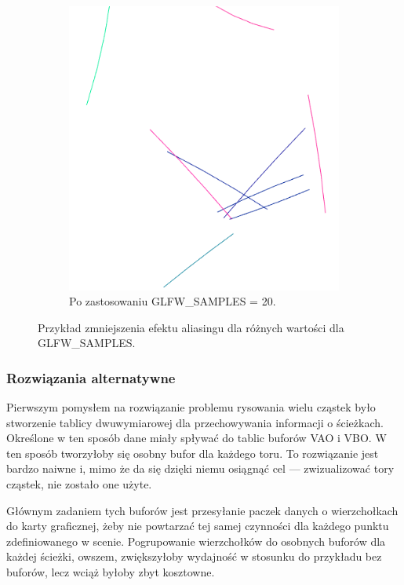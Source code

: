 \begin{figure}[H]
\begin{subfigure}{0.5\textwidth}
		\includegraphics[width=\textwidth]{Wart20.png}
    	\caption{Po zastosowaniu GLFW\_SAMPLES = 20.}
		\label{rys16}
	\end{subfigure}
    \caption{Przykład zmniejszenia efektu aliasingu dla różnych wartości dla GLFW\_SAMPLES.}
    \label{rys17}
\end{figure}

\subsubsection{Rozwiązania alternatywne}

Pierwszym pomysłem na rozwiązanie problemu rysowania wielu cząstek było stworzenie tablicy dwuwymiarowej dla przechowywania informacji o ścieżkach. Określone w ten sposób dane miały spływać do tablic buforów VAO i VBO. W ten sposób tworzyłoby się osobny bufor dla każdego toru. To rozwiązanie jest bardzo naiwne i, mimo że da się dzięki niemu osiągnąć cel --- zwizualizować tory cząstek, nie zostało one użyte.

Głównym zadaniem tych buforów jest przesyłanie paczek danych o wierzchołkach do karty graficznej, żeby nie powtarzać tej samej czynności dla każdego punktu zdefiniowanego w scenie. Pogrupowanie wierzchołków do osobnych buforów dla każdej ścieżki, owszem, zwiększyłoby wydajność w stosunku do przykładu bez buforów, lecz wciąż byłoby zbyt kosztowne.

